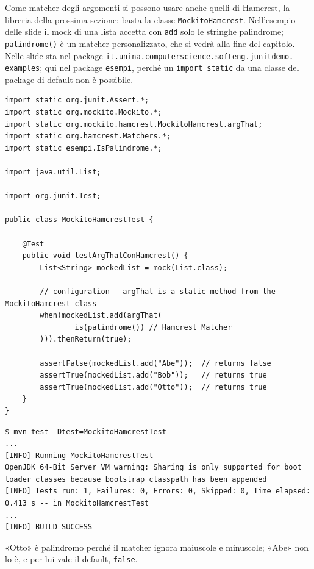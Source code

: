 Come matcher degli argomenti si possono usare anche quelli di Hamcrest, la libreria della prossima sezione: basta la
classe \texttt{MockitoHamcrest}. Nell'esempio delle slide il mock di una lista accetta con \texttt{add} solo le stringhe
palindrome; \texttt{palindrome()} è un matcher personalizzato, che si vedrà alla fine del capitolo. Nelle slide sta nel
package \texttt{it.unina.}\allowbreak\texttt{computerscience.}\allowbreak\texttt{softeng.}\allowbreak\texttt{junitdemo.}%
\allowbreak\texttt{examples}; qui nel package \texttt{esempi}, perché un \texttt{import static} da una classe del package
di default non è possibile.

\begin{lstlisting}[style=java, name=MockitoHamcrestTest.java]
import static org.junit.Assert.*;
import static org.mockito.Mockito.*;
import static org.mockito.hamcrest.MockitoHamcrest.argThat;
import static org.hamcrest.Matchers.*;
import static esempi.IsPalindrome.*;

import java.util.List;

import org.junit.Test;

public class MockitoHamcrestTest {

    @Test
    public void testArgThatConHamcrest() {
        List<String> mockedList = mock(List.class);

        // configuration - argThat is a static method from the MockitoHamcrest class
        when(mockedList.add(argThat(
                is(palindrome()) // Hamcrest Matcher
        ))).thenReturn(true);

        assertFalse(mockedList.add("Abe"));  // returns false
        assertTrue(mockedList.add("Bob"));   // returns true
        assertTrue(mockedList.add("Otto"));  // returns true
    }
}
\end{lstlisting}

\begin{lstlisting}[style=shell, name=Terminale]
$ mvn test -Dtest=MockitoHamcrestTest
...
[INFO] Running MockitoHamcrestTest
OpenJDK 64-Bit Server VM warning: Sharing is only supported for boot loader classes because bootstrap classpath has been appended
[INFO] Tests run: 1, Failures: 0, Errors: 0, Skipped: 0, Time elapsed: 0.413 s -- in MockitoHamcrestTest
...
[INFO] BUILD SUCCESS
\end{lstlisting}

«Otto» è palindromo perché il matcher ignora maiuscole e minuscole; «Abe» non lo è, e per lui vale il default,
\texttt{false}.

